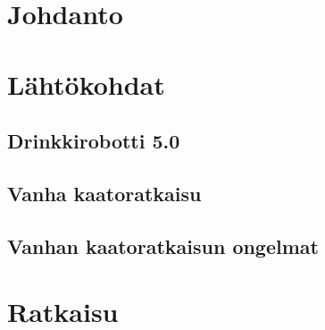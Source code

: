 \documentclass[finnish, numeric, draft]{tauthesis}  %
\begin{document}

\tableofcontents





\glossary


\mainmatter


\chapter{Johdanto}
\label{ch:johdanto}


\chapter{Lähtökohdat}
\label{ch:lähtökohdat}

\section{Drinkkirobotti 5.0}
\label{ch:drinkkirobotti_5.0}


\section{Vanha kaatoratkaisu}
\label{ch:vanha_kaato}


\section{Vanhan kaatoratkaisun ongelmat}
\label{ch:vanhan_ongelmat}


\chapter{Ratkaisu}
\label{ch:ratkaisu}
\end{document}
